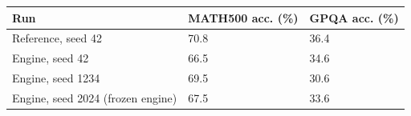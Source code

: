 \begin{tabular}{lll}
\toprule
Run & MATH500 acc. (\%) & GPQA acc. (\%) \\
\midrule
Reference, seed 42 & 70.8 & 36.4 \\
Engine, seed 42 & 66.5 & 34.6 \\
Engine, seed 1234 & 69.5 & 30.6 \\
Engine, seed 2024 (frozen engine) & 67.5 & 33.6 \\
\bottomrule
\end{tabular}
